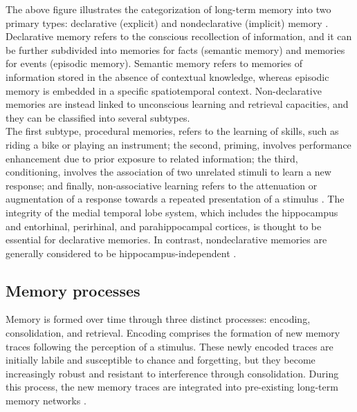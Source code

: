 \FloatBarrier

The above figure illustrates the categorization of long-term memory into two primary types: declarative (explicit) and nondeclarative (implicit) memory \parencite{henke_model_2010,squire_conscious_2015,squire_structure_1996}. Declarative memory refers to the conscious recollection of information, and it can be further subdivided into memories for facts (semantic memory) and memories for events (episodic memory). Semantic memory refers to memories of information stored in the absence of contextual knowledge, whereas episodic memory is embedded in a specific spatiotemporal context. Non-declarative memories are instead linked to unconscious learning and retrieval capacities, and they can be classified into several subtypes. \\
The first subtype, procedural memories, refers to the learning of skills, such as riding a bike or playing an instrument; the second, priming, involves performance enhancement due to prior exposure to related information; the third, conditioning, involves the association of two unrelated stimuli to learn a new response; and finally, non-associative learning refers to the attenuation or augmentation of a response towards a repeated presentation of a stimulus \parencite{henke_model_2010,rasch_about_2013,squire_conscious_2015,squire_structure_1996}. The integrity of the medial temporal lobe system, which includes the hippocampus and entorhinal, perirhinal, and parahippocampal cortices, is thought to be essential for declarative memories. In contrast, nondeclarative memories are generally considered to be hippocampus-independent \parencite{squire_conscious_2015,squire_structure_1996}.
\FloatBarrier



\subsection{Memory processes}\label{Intro:sec:Memory processes}
Memory is formed over time through three distinct processes: encoding, consolidation, and retrieval. 
Encoding comprises the formation of new memory traces following the perception of a stimulus. These newly encoded traces are initially labile and susceptible to chance and forgetting, but they become increasingly robust and resistant to interference through consolidation. During this process, the new memory traces are integrated into pre-existing long-term memory networks \parencite{rasch_about_2013}.

